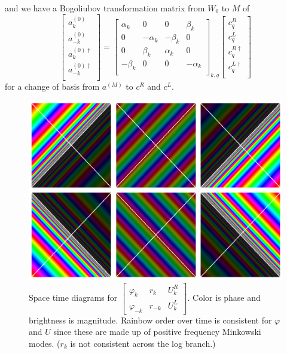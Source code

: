 \documentclass[12pt,a4paper]{article}
\begin{document}
and we have a Bogoliubov transformation matrix from $W_0$ to $M$ of
\begin{equation}
  \left[ \begin{array}{l}
    a^{(0)}_k \\
    a^{(0)}_{-k} \\
    \hline
    a^{(0)\dagger}_k \\
    a^{(0)\dagger}_{-k} \\
 \end{array} \right] = 
  \left[
\begin{array}{rr|rr}
    \alpha_k &       0   &  0       & \beta_k \\
    0        & -\alpha_k & -\beta_k & 0 \\
    \hline
    0        & \beta_k   & \alpha_k & 0 \\
    -\beta_k &    0      &   0      & -\alpha_k \\
\end{array} \right]_{k,q}
\left[ \begin{array}{l}
    c^R_q \\
    c^L_q \\
    \hline
    c^{R\dagger}_q \\
    c^{L\dagger}_q \\
 \end{array} \right]
\end{equation}
for a change of basis from $a^{(M)}$ to $c^R$ and $c^L$. 

\begin{figure}[h]
\centering
\includegraphics[scale=0.5]{unruh_mode_rainbow.png}
\caption{Space time diagrams for $\left[\begin{array}{ccc} \varphi_k & r_k & U^R_k \\ \varphi_{-k} & r_{-k} & U^L_k \end{array} \right]$.  Color is phase and brightness is magnitude. Rainbow order over time is consistent for $\varphi$ and $U$ since these are made up of positive frequency Minkowski modes. ($r_k$ is not consistent across the log branch.)}
\label{masslessshell}
\end{figure}
\end{document}
